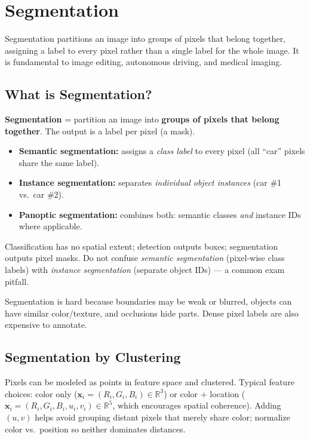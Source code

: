 \documentclass[11pt, oneside]{book}
\newcommand{\R}{\mathbb{R}}
\newcommand{\vct}[1]{\bm{#1}}           %
\begin{document}
\chapter{Segmentation}

Segmentation partitions an image into groups of pixels that belong together, assigning a label to every pixel
rather than a single label for the whole image. It is fundamental to image editing, autonomous driving,
and medical imaging.

\section{What is Segmentation?}

\begin{defbox}[title={Segmentation}]
\textbf{Segmentation} = partition an image into \textbf{groups of pixels that belong together}.
The output is a label per pixel (a mask).
\begin{itemize}
  \item \textbf{Semantic segmentation:} assigns a \emph{class label} to every pixel (all ``car'' pixels share the same label).
  \item \textbf{Instance segmentation:} separates \emph{individual object instances} (car \#1 vs.\ car \#2).
  \item \textbf{Panoptic segmentation:} combines both: semantic classes \emph{and} instance IDs where applicable.
\end{itemize}
\end{defbox}

Classification has no spatial extent; detection outputs boxes; segmentation outputs pixel masks.
Do not confuse \emph{semantic segmentation} (pixel-wise class labels) with \emph{instance segmentation} (separate object IDs) --- a common exam pitfall.

Segmentation is hard because boundaries may be weak or blurred, objects can have similar color/texture,
and occlusions hide parts. Dense pixel labels are also expensive to annotate.

\section{Segmentation by Clustering}

Pixels can be modeled as points in feature space and clustered. Typical feature choices:
color only ($\vct{x}_i = (R_i,G_i,B_i)\in\R^3$) or color + location
($\vct{x}_i = (R_i,G_i,B_i,u_i,v_i)\in\R^5$, which encourages spatial coherence).
Adding $(u,v)$ helps avoid grouping distant pixels that merely share color; normalize color vs.\ position
so neither dominates distances.
\end{document}
